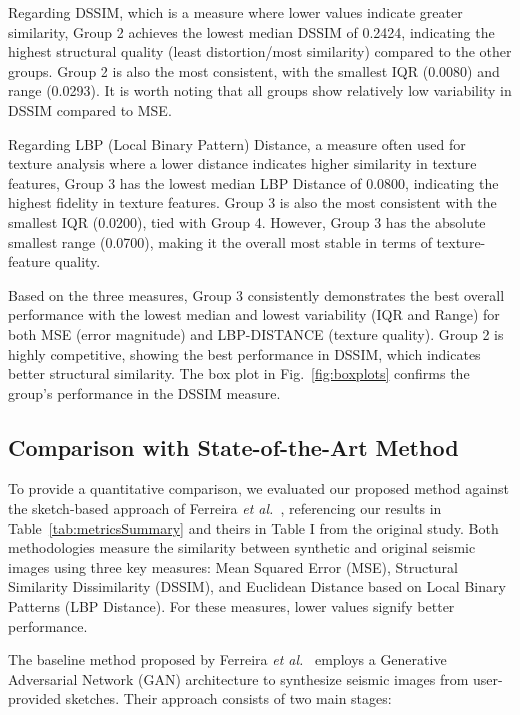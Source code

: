 \documentclass{ieeeaccess}
\begin{document}
Regarding DSSIM, which is a measure where lower values indicate greater similarity, Group 2 achieves the lowest median DSSIM of 0.2424, indicating the highest structural quality (least distortion/most similarity) compared to the other groups. Group 2 is also the most consistent, with the smallest IQR (0.0080) and range (0.0293). It is worth noting that all groups show relatively low variability in DSSIM compared to MSE.

Regarding LBP (Local Binary Pattern) Distance, a measure often used for texture analysis where a lower distance indicates higher similarity in texture features, Group 3 has the lowest median LBP Distance of 0.0800, indicating the highest fidelity in texture features. Group 3 is also the most consistent with the smallest IQR (0.0200), tied with Group 4. However, Group 3 has the absolute smallest range (0.0700), making it the overall most stable in terms of texture-feature quality.

Based on the three measures, Group 3 consistently demonstrates the best overall performance with the lowest median and lowest variability (IQR and Range) for both MSE (error magnitude) and LBP-DISTANCE (texture quality). Group 2 is highly competitive, showing the best performance in DSSIM, which indicates better structural similarity. The box plot in Fig.~\ref{fig:boxplots} confirms the group's performance in the DSSIM measure.

\subsection{Comparison with State-of-the-Art Method}

To provide a quantitative comparison, we evaluated our proposed method against the sketch-based approach of Ferreira \emph{et al.}~\cite{Ferreira2020}, referencing our results in Table~\ref{tab:metricsSummary} and theirs in Table I from the original study. Both methodologies measure the similarity between synthetic and original seismic images using three key measures: Mean Squared Error (MSE), Structural Similarity Dissimilarity (DSSIM), and Euclidean Distance based on Local Binary Patterns (LBP Distance). For these measures, lower values signify better performance.

The baseline method proposed by Ferreira \emph{et al.}~\cite{Ferreira2020} employs a Generative Adversarial Network (GAN) architecture to synthesize seismic images from user-provided sketches. Their approach consists of two main stages:
\end{document}
